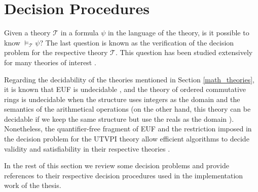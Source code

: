 \section{Decision Procedures} \label{decision_procedures}

Given a theory $\mathcal{T}$ in a formula $\psi$ in 
the language of the theory, is it possible to know 
$\models_{\mathcal{T}} \psi$? The last question is 
known as the verification of the decision problem for 
the respective theory $\mathcal{T}$. This question has 
been studied extensively for many theories of interest 
\cite{borger2001classical}. 

Regarding the decidability of the theories 
mentioned in Section \ref{math_theories}, it is known that 
EUF is undecidable \cite{borger2001classical}, and the theory
of ordered commutative rings is undecidable when the
structure uses integers as the domain and the semantics
of the arithmetical operations \cite{DBLP:books/daglib/0076838} 
(on the other hand, this theory can be decidable if we
keep the same structure but use the reals as the domain
\cite{DBLP:books/daglib/0076838}).
Nonetheless, the quantifier-free fragment of EUF and 
the restriction imposed in the decision problem for 
the UTVPI theory allow efficient algorithms to decide 
validity and satisfiability in their respective theories 
\cite{10.1145/322186.322198, 10.1145/322217.322228, 
10.1007/11559306_9}.

In the rest of this section we review some decision 
problems and provide references to their respective
decision procedures used in the implementation work of 
the thesis.






